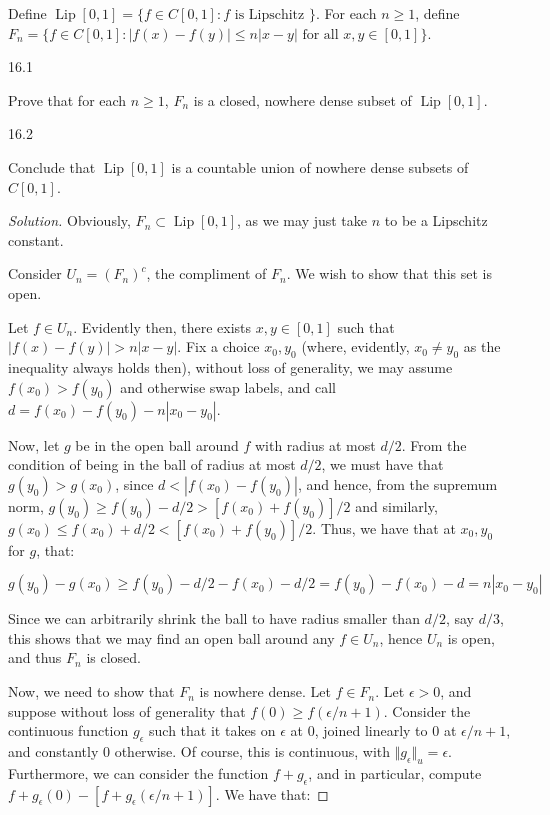 \documentclass[10pt]{article}
\newenvironment{problem}[2][]{\begin{trivlist}
\item[\hskip \labelsep {\bfseries #1}\hskip \labelsep {\bfseries #2.}]}{\end{trivlist}}
\begin{document}
\begin{problem}{Question 16}

Define $\operatorname{Lip}[0,1] = \{ f \in C[0,1] : f \text{ is Lipschitz } \}$. For each $n \geq 1$, define $F_n = \{ f \in C[0,1] : |f(x) - f(y)| \leq n | x - y| \text{ for all } x, y \in [0,1] \}$.

16.1

Prove that for each $n \geq 1$, $F_n$ is a closed, nowhere dense subset of $\operatorname{Lip}[0,1]$.

16.2

Conclude that  $\operatorname{Lip}[0,1]$ is a countable union of nowhere dense subsets of $C[0,1]$.

\end{problem}

\begin{proof}[Solution]

Obviously, $F_n \subset \operatorname{Lip}[0,1]$, as we may just take $n$ to be a Lipschitz constant.

Consider $U_n = (F_n)^c$, the compliment of $F_n$. We wish to show that this set is open.

Let $f \in U_n$. Evidently then, there exists $x, y \in [0,1]$ such that $| f(x) - f(y) | > n | x - y| $. Fix a choice $x_0,y_0$ (where, evidently, $x_0 \not = y_0$ as the inequality always holds then), without loss of generality, we may assume $f(x_0) > f(y_0)$ and otherwise swap labels, and call $d = f(x_0) - f(y_0) - n | x_0 - y_0|$.

Now, let $g$ be in the open ball around $f$ with radius at most $d/2$. From the condition of being in the ball of radius at most $d/2$, we must have that $g(y_0) > g(x_0)$, since $d < | f(x_0) - f(y_0)|$, and hence, from the supremum norm, $g(y_0) \geq f(y_0) - d/2  > [f(x_0) + f(y_0)]/2$ and similarly, $g(x_0) \leq f(x_0) + d/2 < [f(x_0) + f(y_0)]/2$. Thus, we have that at $x_0, y_0$ for $g$, that:

$$ g(y_0) - g(x_0) \geq f(y_0) - d/2  - f(x_0) - d/2  = f(y_0) - f(x_0) - d = n |x_0 - y_0| $$

Since we can arbitrarily shrink the ball to have radius smaller than $d/2$, say $d/3$, this shows that we may find an open ball around any $f \in U_n$, hence $U_n$ is open, and thus $F_n$ is closed.

Now, we need to show that $F_n$ is nowhere dense. Let $f \in F_n$. Let $\epsilon > 0$, and suppose without loss of generality that $f(0) \geq f(\epsilon/n+1)$. Consider the continuous function $g_\epsilon$ such that it takes on $\epsilon$ at 0, joined linearly to $0$ at $\epsilon/n+1$, and constantly $0$ otherwise. Of course, this is continuous, with $\Vert g_\epsilon \Vert_u = \epsilon$. Furthermore, we can consider the function $f + g_\epsilon$, and in particular, compute $f + g_\epsilon(0) - [f + g_\epsilon(\epsilon/n+1)]$. We have that:


\end{proof}
\end{document}
